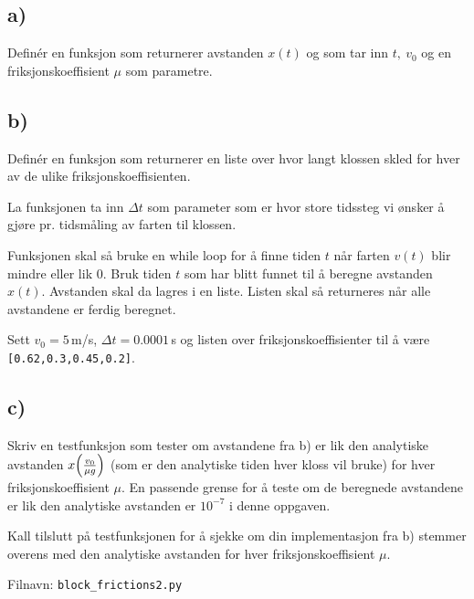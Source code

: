 \documentclass[10pt,a4paper]{article}
\begin{document}
 
\subsection*{a)}
Definér en funksjon som returnerer avstanden $x(t)$ og som tar inn $t, \ v_0 $ og en friksjonskoeffisient $\mu$ som parametre.
\subsection*{b)}
Definér en funksjon som returnerer en liste over hvor langt klossen skled for hver av de ulike friksjonskoeffisienten. 
 
La funksjonen ta inn $\Delta t$ som parameter som er hvor store tidssteg vi ønsker å gjøre pr. tidsmåling av farten til klossen. 
 
Funksjonen skal så bruke en while loop for å finne tiden $t$ når farten $v(t)$ blir mindre eller lik 0. Bruk tiden $t$ som har blitt funnet til å beregne avstanden $x(t)$. Avstanden skal da lagres i en liste. Listen skal så returneres når alle avstandene er ferdig beregnet. 
 
Sett $v_0 = 5\,$m/s, $\Delta t = 0.0001\,$s og listen over friksjonskoeffisienter til å være \texttt{[0.62,0.3,0.45,0.2]}.
\subsection*{c)}
Skriv en testfunksjon som tester om avstandene fra b) er lik den analytiske avstanden $x\qty(\frac{v_0}{\mu g})$ (som er den analytiske tiden hver kloss vil bruke) for hver friksjonskoeffisient $\mu$. En passende grense for å teste om de beregnede avstandene er lik den analytiske avstanden er $10^{-7}$ i denne oppgaven. 
 
Kall tilslutt på testfunksjonen for å sjekke om din implementasjon fra b) stemmer overens med den analytiske avstanden for hver friksjonskoeffisient $\mu$.  
 
Filnavn: \texttt{block\_frictions2.py}
\end{document}
